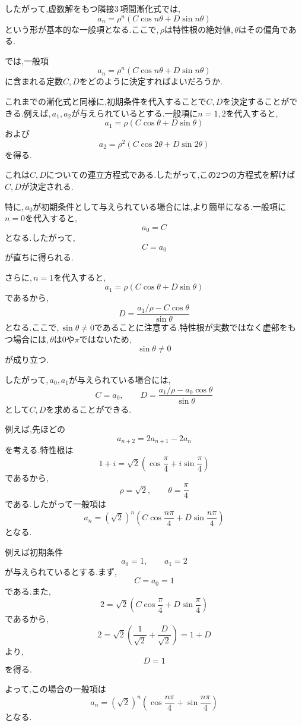   したがって,虚数解をもつ隣接3\,項間漸化式では,
  \[
    a_n=\rho^n(C\cos n\theta+D\sin n\theta)
  \]
  という形が基本的な一般項となる.ここで,\,$\rho$は特性根の絶対値,\,$\theta$はその偏角である.

  では,一般項
  \[
    a_n=\rho^n(C\cos n\theta+D\sin n\theta)
  \]
  に含まれる定数$C,D$をどのように決定すればよいだろうか.

  これまでの漸化式と同様に,初期条件を代入することで$C,D$を決定することができる.例えば,\,$a_1,a_2$が与えられているとする.一般項に$n=1,2$を代入すると,
  \[
    a_1=\rho(C\cos\theta+D\sin\theta)
  \]
  および
  \[
    a_2=\rho^2(C\cos2\theta+D\sin2\theta)
  \]
  を得る.

  これは$C,D$についての連立方程式である.したがって,この2つの方程式を解けば$C,D$が決定される.

  特に,\,$a_0$が初期条件として与えられている場合には,より簡単になる.一般項に$n=0$を代入すると,
  \[
    a_0=C
  \]
  となる.したがって,
  \[
    C=a_0
  \]
  が直ちに得られる.

  さらに,\,$n=1$を代入すると,
  \[
    a_1=\rho(C\cos\theta+D\sin\theta)
  \]
  であるから,
  \[
    D=
    \frac{a_1/\rho-C\cos\theta}{\sin\theta}
  \]
  となる.ここで,\,$\sin\theta\neq0$であることに注意する.特性根が実数ではなく虚部をもつ場合には,\,$\theta$は$0$や$\pi$ではないため,
  \[
    \sin\theta\neq0
  \]
  が成り立つ.

  したがって,\,$a_0,a_1$が与えられている場合には,
  \[
    C=a_0,\qquad
    D=\frac{a_1/\rho-a_0\cos\theta}{\sin\theta}
  \]
  として$C,D$を求めることができる.

  例えば,先ほどの
  \[
    a_{n+2}=2a_{n+1}-2a_n
  \]
  を考える.特性根は
  \[
    1+i
    =\sqrt{2}
    \left(
      \cos\frac{\pi}{4}
      +i\sin\frac{\pi}{4}
    \right)
  \]
  であるから,
  \[
    \rho=\sqrt{2},\qquad
    \theta=\frac{\pi}{4}
  \]
  である.したがって一般項は
  \[
    a_n=(\sqrt{2})^n
    \left(
      C\cos\frac{n\pi}{4}
      +D\sin\frac{n\pi}{4}
    \right)
  \]
  となる.

  例えば初期条件
  \[
    a_0=1,\qquad a_1=2
  \]
  が与えられているとする.まず,
  \[
    C=a_0=1
  \]
  である.また,
  \[
    2=\sqrt{2}
    \left(
      C\cos\frac{\pi}{4}
      +D\sin\frac{\pi}{4}
    \right)
  \]
  であるから,
  \[
    2=\sqrt{2}
    \left(
      \frac{1}{\sqrt{2}}
      +\frac{D}{\sqrt{2}}
    \right)
    =1+D
  \]
  より,
  \[
    D=1
  \]
  を得る.

  よって,この場合の一般項は
  \[
    a_n=(\sqrt{2})^n
    \left(
      \cos\frac{n\pi}{4}
      +\sin\frac{n\pi}{4}
    \right)
  \]
  となる.

